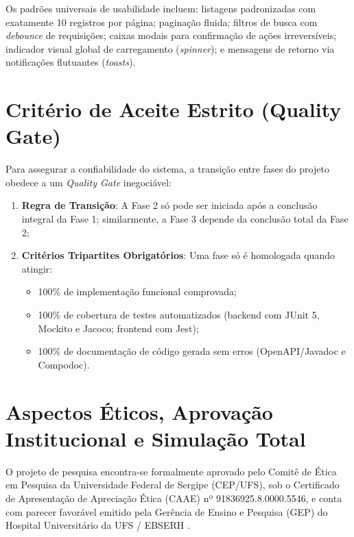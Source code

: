 Os padrões universais de usabilidade incluem: listagens padronizadas com exatamente 10 registros por página; paginação fluida; filtros de busca com \textit{debounce} de requisições; caixas modais para confirmação de ações irreversíveis; indicador visual global de carregamento (\textit{spinner}); e mensagens de retorno via notificações flutuantes (\textit{toasts}).

\section{Critério de Aceite Estrito (Quality Gate)}
\label{sec:quality-gate}

Para assegurar a confiabilidade do sistema, a transição entre fases do projeto obedece a um \textit{Quality Gate} inegociável:
\begin{enumerate}
    \item \textbf{Regra de Transição}: A Fase 2 só pode ser iniciada após a conclusão integral da Fase 1; similarmente, a Fase 3 depende da conclusão total da Fase 2;
    \item \textbf{Critérios Tripartites Obrigatórios}: Uma fase só é homologada quando atingir:
    \begin{itemize}
        \item 100\% de implementação funcional comprovada;
        \item 100\% de cobertura de testes automatizados (backend com JUnit 5, Mockito e Jacoco; frontend com Jest);
        \item 100\% de documentação de código gerada sem erros (OpenAPI/Javadoc e Compodoc).
    \end{itemize}
\end{enumerate}

\section{Aspectos Éticos, Aprovação Institucional e Simulação Total}
\label{sec:aspectos-eticos}

O projeto de pesquisa encontra-se formalmente aprovado pelo Comitê de Ética em Pesquisa da Universidade Federal de Sergipe (CEP/UFS), sob o Certificado de Apresentação de Apreciação Ética (CAAE) nº 91836925.8.0000.5546, e conta com parecer favorável emitido pela Gerência de Ensino e Pesquisa (GEP) do Hospital Universitário da UFS / EBSERH \cite{cep_ufs2025}.

